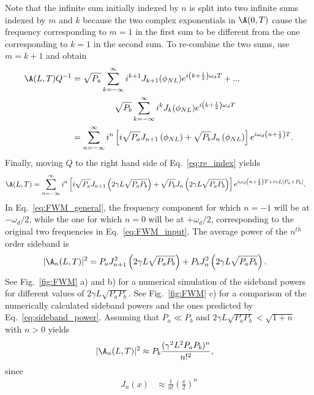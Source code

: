 Note that the infinite sum initially indexed by $n$ is split into two infinite sums indexed by $m$ and $k$ because the two complex exponentials in $\A(0,T)$ cause the frequency corresponding to $m=1$ in the first sum to be different from the one corresponding to $k=1$ in the second sum. To re-combine the two sums, use $m=k+1$ and obtain
\begin{align}
\label{eq:re_index}
    \A(L,T)Q^{-1}&=\sqrt{P_a}\sum_{k=-\infty}^{\infty}i^{k+1}J_{k+1}(\phi_{NL})e^{i\left(k+\frac{1}{2}\right)\omega_dT}+...\\ \nonumber & \quad\quad\quad\quad\quad\sqrt{P_b}\sum_{k=-\infty}^{\infty}i^kJ_k(\phi_{NL})e^{i\left(k+\frac{1}{2}\right)\omega_dT} \\ \nonumber
    &= \sum_{n=-\infty}^{\infty} i^n\left[i\sqrt{P_a}J_{n+1}\left(\phi_{NL}\right)+\sqrt{P_b}J_n\left(\phi_{NL}\right)\right]e^{i\omega_d\left(n+\frac{1}{2}\right)T}.
\end{align}
Finally, moving $Q$ to the right hand side of Eq.~\ref{eq:re_index} yields
\begin{align}
\label{eq:FWM_general}
    \A(L,T)&=\sum_{n=-\infty}^{\infty} i^n\left[i\sqrt{P_a}J_{n+1}\left(2\gamma L\sqrt{P_aP_b}\right)+\sqrt{P_b}J_n\left(2\gamma L\sqrt{P_aP_b}\right)\right]e^{i\omega_d\left(n+\frac{1}{2}\right)T+i\gamma L[P_a+P_b]}.
\end{align}
In Eq.~\ref{eq:FWM_general}, the frequency component for which $n=-1$ will be at $-\omega_d/2$, while the one for which $n=0$ will be at $+\omega_d/2$, corresponding to the original two frequencies in Eq.~\ref{eq:FWM_input}. The average power of the $n^{th}$ order sideband is
\begin{align}
\label{eq:sideband_power}
    |\A_n(L,T)|^2 &= P_aJ^2_{n+1}\left(2\gamma L \sqrt{P_aP_b}\right)+P_bJ^2_{n}\left(2\gamma L \sqrt{P_aP_b}\right).
\end{align}
See Fig.~\ref{fig:FWM} a) and b) for a numerical simulation of the sideband powers for different values of $2\gamma L \sqrt{P_aP_b}$. See Fig.~\ref{fig:FWM} c) for a comparison of the numerically calculated sideband powers and the ones predicted by Eq.~\ref{eq:sideband_power}. Assuming that $P_a\ll P_b$ and $2\gamma L\sqrt{P_aP_b}<\sqrt{1+n}$ with $n>0$ yields
\begin{align}
\label{eq:sideband_approx}
    |\A_n(L,T)|^2 &\approx P_b\frac{(\gamma^2 L^2P_aP_b)^{n}}{n!^2},
\end{align}
since
\begin{align}
\label{eq:Bessel_approx}
    J_n(x)&\approx \frac{1}{n!}\left(\frac{x}{2}\right)^n
\end{align}
